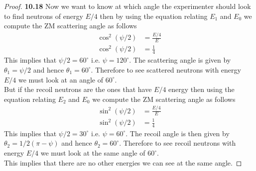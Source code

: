 \documentclass[11pt]{article}
\theoremstyle{definition}
\begin{document}
\begin{proof}{\textbf{10.18}}
        Now we want to know at which angle the experimenter should look to find
        neutrons of energy $E/4$ then by using the equation relating $E_1$ and $E_0$
        we compute the ZM scattering angle as follows
        \begin{align*}
            \cos^2(\psi/2) &= \frac{E/4}{E}\\
            \cos^2(\psi/2) &= \frac{1}{4}
        \end{align*}
        This implies that $\psi/2 = 60^\circ$ i.e. $\psi = 120^\circ$.
        The scattering angle is given by $\theta_1 = \psi/2$ and hence
        $\theta_1 = 60^\circ$. Therefore to see scattered neutrons with energy
        $E/4$ we must look at an angle of $60^\circ$.\\
        But if the recoil neutrons are the ones that have $E/4$ energy then
        using the equation relating $E_2$ and $E_0$ we compute the ZM
        scattering angle as follows
        \begin{align*}
            \sin^2(\psi/2) &= \frac{E/4}{E}\\
            \sin^2(\psi/2) &= \frac{1}{4}
        \end{align*}
        This implies that $\psi/2 = 30^\circ$ i.e. $\psi = 60^\circ$.
        The recoil angle is then given by $\theta_2 = 1/2(\pi - \psi)$ and
        hence $\theta_2 = 60^\circ$. Therefore to see recoil neutrons with
        energy $E/4$ we must look at the same angle of $60^\circ$.\\
        This implies that there are no other energies we can see at the same
        angle.
    \end{proof}
\cleardoublepage
\end{document}
